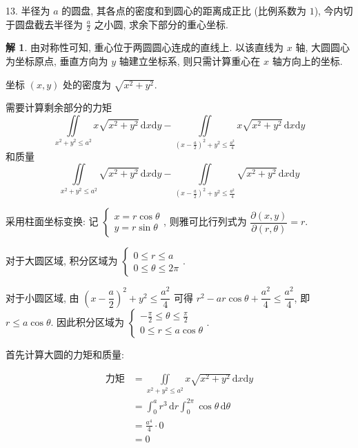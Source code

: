 \documentclass[a4paper,12pt]{article}
\theoremstyle{definition}
\newtheorem*{sol}{解}
\begin{document}
13. 半径为 $a$ 的圆盘, 其各点的密度和到圆心的距离成正比 (比例系数为 $1$), 今内切于圆盘截去半径为 $\frac{a}{2}$ 之小圆, 求余下部分的重心坐标.
\begin{sol}
    由对称性可知, 重心位于两圆圆心连成的直线上. 以该直线为 $x$ 轴, 大圆圆心为坐标原点, 垂直方向为 $y$ 轴建立坐标系, 则只需计算重心在 $x$ 轴方向上的坐标.

    坐标 $(x,y)$ 处的密度为 $\sqrt{x^2+y^2}$.

    需要计算剩余部分的力矩
    $$\iint\limits_{x^2+y^2\leq a^2}x\sqrt{x^2+y^2}\,\mathrm{d}x\mathrm{d}y-\iint\limits_{\left(x-\frac{a}{2}\right)^2+y^2\leq\frac{a^2}{4}}x\sqrt{x^2+y^2}\,\mathrm{d}x\mathrm{d}y$$
    和质量
    $$\iint\limits_{x^2+y^2\leq a^2}\sqrt{x^2+y^2}\,\mathrm{d}x\mathrm{d}y-\iint\limits_{\left(x-\frac{a}{2}\right)^2+y^2\leq\frac{a^2}{4}}\sqrt{x^2+y^2}\,\mathrm{d}x\mathrm{d}y$$

    采用柱面坐标变换: 记 $\begin{cases}
            x=r\cos\theta \\
            y=r\sin\theta
        \end{cases}$, 则雅可比行列式为 $\dfrac{\partial(x,y)}{\partial(r,\theta)}=r$.

    对于大圆区域, 积分区域为 $\begin{cases}
            0\leq r\leq a \\
            0\leq \theta\leq 2\pi
        \end{cases}$.

    对于小圆区域, 由 $\left(x-\dfrac{a}{2}\right)^2+y^2\leq\dfrac{a^2}{4}$ 可得 $r^2-ar\cos\theta+\dfrac{a^2}{4}\leq\dfrac{a^2}{4}$, 即 $r\leq a\cos\theta$. 因此积分区域为 $\begin{cases}
            -\frac{\pi}{2}\leq \theta\leq \frac{\pi}{2} \\
            0\leq r\leq a\cos \theta
        \end{cases}$.

    首先计算大圆的力矩和质量:

    \begin{align*}
        \text{力矩}
         & =\iint\limits_{x^2+y^2\leq a^2}x\sqrt{x^2+y^2}\,\mathrm{d}x\mathrm{d}y \\
         & =\int_0^a r^3\,\mathrm{d}r\int_0^{2\pi}\cos\theta\,\mathrm{d}\theta    \\
         & =\frac{a^4}{4}\cdot0                                                   \\
         & =0
    \end{align*}


\end{sol}
\end{document}

